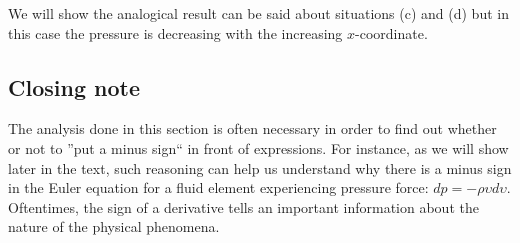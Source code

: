 We will show the analogical result can be said about situations (c) and (d) but in this case the pressure is decreasing with the increasing $x$-coordinate.



\subsection{Closing note}

The analysis done in this section is often necessary in order to find out whether or not to ''put a minus sign`` in front of expressions. For instance, as we will show later in the text, such reasoning can help us understand why there is a minus sign in the Euler equation for a fluid element experiencing pressure force: $dp = - \rho \upsilon d \upsilon$. Oftentimes, the sign of a derivative tells an important information about the nature of the physical phenomena.





